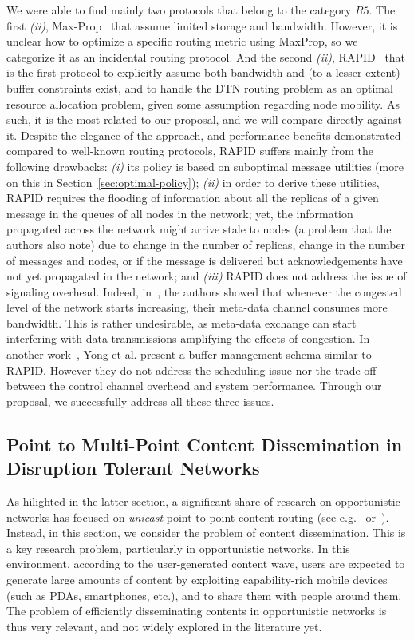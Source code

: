 We were able to find mainly two protocols that belong to the category $R5$. The first \emph{(ii)}, Max-Prop~\cite{Levine:MaxProp} that assume limited storage and bandwidth. However, it is unclear how to optimize a specific routing metric using MaxProp, so we categorize it as an incidental routing protocol. And the second \emph{(ii)}, RAPID~\cite{BalasubramanianLV07} that is the first protocol to explicitly assume both bandwidth and (to a lesser extent) buffer constraints exist, and to handle the DTN routing problem as an optimal resource allocation problem, given some assumption regarding node mobility. As such, it is the most related to our proposal, and we will compare  directly against it. Despite the elegance of the approach, and performance benefits demonstrated compared to well-known routing protocols, RAPID suffers mainly from the following drawbacks: \emph{(i)} its policy is based on suboptimal message utilities (more on this in Section~\ref{sec:optimal-policy}); \emph{(ii)} in order to derive these utilities, RAPID requires the flooding of information about all the replicas of a given message in the queues of all nodes in the network; yet, the information propagated across the network might arrive stale to nodes (a problem that the authors also note) due to change in the number of replicas, change in the number of messages and nodes, or if the message is delivered but acknowledgements have not yet propagated in the network; and \emph{(iii)} RAPID does not address the issue of signaling overhead. Indeed, in~\cite{Levine:Sigcomm07}, the authors showed that whenever the congested level of the network starts increasing, their meta-data channel consumes more bandwidth. This is rather undesirable, as meta-data exchange can start interfering with data transmissions amplifying the effects of congestion. In another work~\cite{AOBM}, Yong et al. present a buffer management schema similar to RAPID. However they do not address the scheduling issue nor the trade-off between the control channel overhead and system performance. Through our proposal, we successfully address all these three issues.

\subsection{Point to Multi-Point Content Dissemination in Disruption Tolerant Networks}

As hilighted in the latter section, a significant share of research on opportunistic networks has focused on \emph{unicast} point-to-point content routing (see e.g.~\cite{DTNTaxonomy} or~\cite{Passarella:Survey}). Instead, in this section, we consider the problem of content dissemination. This is a key research problem, 
particularly in opportunistic networks. In this environment, according to the user-generated content wave, users are expected to generate large amounts of content 
by exploiting capability-rich mobile devices (such as PDAs, smartphones, etc.), and to share them with people around them.  The problem of efficiently disseminating contents in opportunistic networks is thus very relevant, and not widely explored in the literature yet.
 

